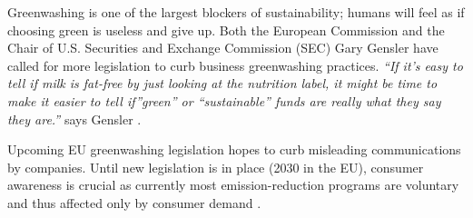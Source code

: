 \documentclass[
  letterpaper,
  DIV=11,
  numbers=noendperiod]{scrartcl}
\begin{document}
Greenwashing is one of the largest blockers of sustainability; humans
will feel as if choosing green is useless and give up. Both the European
Commission and the Chair of U.S. Securities and Exchange Commission
(SEC) Gary Gensler have called for more legislation to curb business
greenwashing practices. \emph{``If it's easy to tell if milk is fat-free
by just looking at the nutrition label, it might be time to make it
easier to tell if''green'' or ``sustainable'' funds are really what they
say they are.''} says Gensler
\citep{ussecuritiesandexchangecommissionOfficeHoursGary2022}.

Upcoming EU greenwashing legislation hopes to curb misleading
communications by companies. Until new legislation is in place (2030 in
the EU), consumer awareness is crucial as currently most
emission-reduction programs are voluntary and thus affected only by
consumer demand \citep{andreVoluntaryCarbonNeutral2022}.
\end{document}
